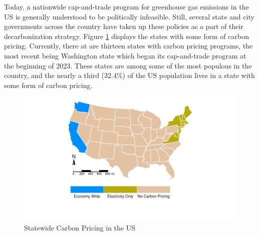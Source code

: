 Today, a nationwide cap-and-trade program for greenhouse gas emissions in the US is generally understood to be politically infeasible. Still, several state and city governments across the country have taken up these policies as a part of their decarbonization strategy. Figure \ref{cap_states} displays the states with some form of carbon pricing. Currently, there at are thirteen states with carbon pricing programs, the most recent being Washington state which began its cap-and-trade program at the beginning of 2023. These states are among some of the most populous in the country, and the nearly a third (32.4\%) of the US population lives in a state with some form of carbon pricing. 






\begin{figure}
    \centering
    \caption{Statewide Carbon Pricing in the US\label{cap_states}}
    \includegraphics[width = \textwidth]{figures/chapter3_figures/cap_programs.pdf}
    \vspace*{-1.8cm}
\end{figure}


